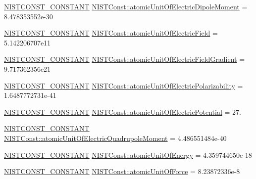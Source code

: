 \begin{DoxyCompactItemize}
\item 
\mbox{\hyperlink{group___n_i_s_t_const-_macros_ga2b0fc1d7452373f816175dd86ce26729}{N\+I\+S\+T\+C\+O\+N\+S\+T\+\_\+\+C\+O\+N\+S\+T\+A\+NT}} \mbox{\hyperlink{group___n_i_s_t_const-_atomic_unit_ga9d0aa0f462c3cbf3000181f1f4dc2e97}{N\+I\+S\+T\+Const\+::atomic\+Unit\+Of\+Electric\+Dipole\+Moment}} = 8.\+478353552e-\/30
\item 
\mbox{\hyperlink{group___n_i_s_t_const-_macros_ga2b0fc1d7452373f816175dd86ce26729}{N\+I\+S\+T\+C\+O\+N\+S\+T\+\_\+\+C\+O\+N\+S\+T\+A\+NT}} \mbox{\hyperlink{group___n_i_s_t_const-_atomic_unit_ga5d6c6686a6a6ea451d3cb975878f623a}{N\+I\+S\+T\+Const\+::atomic\+Unit\+Of\+Electric\+Field}} = 5.\+142206707e11
\item 
\mbox{\hyperlink{group___n_i_s_t_const-_macros_ga2b0fc1d7452373f816175dd86ce26729}{N\+I\+S\+T\+C\+O\+N\+S\+T\+\_\+\+C\+O\+N\+S\+T\+A\+NT}} \mbox{\hyperlink{group___n_i_s_t_const-_atomic_unit_ga02c36e91d6f95d818656270669d20926}{N\+I\+S\+T\+Const\+::atomic\+Unit\+Of\+Electric\+Field\+Gradient}} = 9.\+717362356e21
\item 
\mbox{\hyperlink{group___n_i_s_t_const-_macros_ga2b0fc1d7452373f816175dd86ce26729}{N\+I\+S\+T\+C\+O\+N\+S\+T\+\_\+\+C\+O\+N\+S\+T\+A\+NT}} \mbox{\hyperlink{group___n_i_s_t_const-_atomic_unit_ga635fe4831055d2787293d19a8134c0c7}{N\+I\+S\+T\+Const\+::atomic\+Unit\+Of\+Electric\+Polarizability}} = 1.\+6487772731e-\/41
\item 
\mbox{\hyperlink{group___n_i_s_t_const-_macros_ga2b0fc1d7452373f816175dd86ce26729}{N\+I\+S\+T\+C\+O\+N\+S\+T\+\_\+\+C\+O\+N\+S\+T\+A\+NT}} \mbox{\hyperlink{group___n_i_s_t_const-_atomic_unit_gaabb37ce172d4f7c491b79ac27db120da}{N\+I\+S\+T\+Const\+::atomic\+Unit\+Of\+Electric\+Potential}} = 27.
\item 
\mbox{\hyperlink{group___n_i_s_t_const-_macros_ga2b0fc1d7452373f816175dd86ce26729}{N\+I\+S\+T\+C\+O\+N\+S\+T\+\_\+\+C\+O\+N\+S\+T\+A\+NT}} \mbox{\hyperlink{group___n_i_s_t_const-_atomic_unit_ga4714cce6077b09c5fd2dbcb3efa95d5b}{N\+I\+S\+T\+Const\+::atomic\+Unit\+Of\+Electric\+Quadrupole\+Moment}} = 4.\+486551484e-\/40
\item 
\mbox{\hyperlink{group___n_i_s_t_const-_macros_ga2b0fc1d7452373f816175dd86ce26729}{N\+I\+S\+T\+C\+O\+N\+S\+T\+\_\+\+C\+O\+N\+S\+T\+A\+NT}} \mbox{\hyperlink{group___n_i_s_t_const-_atomic_unit_gafa7ea08448d60570f5a6f2c6938bc8fc}{N\+I\+S\+T\+Const\+::atomic\+Unit\+Of\+Energy}} = 4.\+359744650e-\/18
\item 
\mbox{\hyperlink{group___n_i_s_t_const-_macros_ga2b0fc1d7452373f816175dd86ce26729}{N\+I\+S\+T\+C\+O\+N\+S\+T\+\_\+\+C\+O\+N\+S\+T\+A\+NT}} \mbox{\hyperlink{group___n_i_s_t_const-_atomic_unit_gaf1da533cf2e7a57f1b0b87613ddea807}{N\+I\+S\+T\+Const\+::atomic\+Unit\+Of\+Force}} = 8.\+23872336e-\/8

\end{DoxyCompactItemize}

